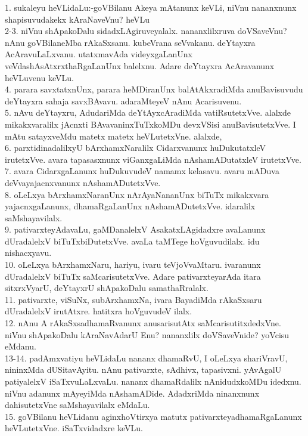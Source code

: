 \documentclass{article}
\begin{document}
1. sukaleyu heVLidaLu:-goVBilanu Akeya mAtanunx keVLi, niVnu nananxnunx shapisuvudakekx kAraNaveVnu? heVLu\\
2-3. niVnu shApakoDalu sidadxLAgiruveyalalx. nananxlilxruva doVSaveVnu? nAnu goVBilaneMba rAkaSxsanu. kubeVrana seVvakanu. deYtayxra AcAravuLaLxvanu. utatxmavAda videyxgaLanUnx veVdashAsAtxrxthaRgaLanUnx balelxnu. Adare deYtayxra AcAravanunx heVLuvenu keVLu.\\
4. parara savxtatxnUnx, parara heMDiranUnx balAtAkxradiMda anuBavisuvudu deYtayxra sahaja savxBAvavu. adaraMteyeV nAnu Acarisuvenu.\\
5. nAvu deYtayxru, AdudariMda deYtAyxcAradiMda vatiRsutetxVve. alalxde mikakxvaralilx jAcnxti BAvavaninxTuTxkoMDu devxVSisi anuBavisutetxVve. I mAtu satayxveMdu matetx matetx heVLutetxVne. alalxde,\\
6. parxtidinadalilxyU bArxhamxNaralilx Cidarxvanunx huDukutatxleV irutetxVve. avara tapasasxnunx viGanxgaLiMda nAshamADutatxleV irutetxVve.\\
7. avara CidarxgaLanunx huDukuvudeV namamx kelasavu. avaru mADuva deVvayajacnxvanunx nAshamADutetxVve.\\
8. oLeLxya bArxhamxNaranUnx nArAyaNananUnx biTuTx mikakxvara yajacnxgaLanunx, dhamaRgaLanUnx nAshamADutetxVve. idaralilx saMshayavilalx.\\
9. pativarxteyAdavaLu, gaMDanalelxV AsakatxLAgidadxre avaLanunx dUradalelxV biTuTxbiDutetxVve. avaLa taMTege hoVguvudilalx. idu nishacxyavu.\\
10. oLeLxya bArxhamxNaru, hariyu, ivaru teVjoVvaMtaru. ivaranunx dUradalelxV biTuTx saMcarisutetxVve. Adare pativarxteyarAda itara sitxrxVyarU, deYtayxrU shApakoDalu samathaRralalx.\\
11. pativarxte, viSuNx, subArxhamxNa, ivara BayadiMda rAkaSxsaru dUradalelxV irutAtxre. hatitxra hoVguvudeV ilalx.\\
12. nAnu A rAkaSxsadhamaRvanunx anusarisutAtx saMcarisutitxdedxVne. niVnu shApakoDalu kAraNavAdarU Enu? nananxlilx doVSaveVnide? yoVcisu eMdanu.\\
13-14. padAmxvatiyu heVLidaLu nananx dhamaRvU, I oLeLxya shariVravU, nininxMda dUSitavAyitu. nAnu pativarxte, sAdhivx, tapasivxni. yAvAgalU patiyalelxV iSaTxvuLaLxvaLu. nananx dhamaRdalilx nAnidudxkoMDu idedxnu. niVnu adanunx mAyeyiMda nAshamADide. AdadxriMda ninanxnunx dahisutetxVne saMshayavilalx eMdaLu.\\
15. goVBilanu heVLidanu aginxhoVtirxya matutx pativarxteyadhamaRgaLanunx heVLutetxVne. iSaTxvidadxre keVLu.\\
\end{document}
